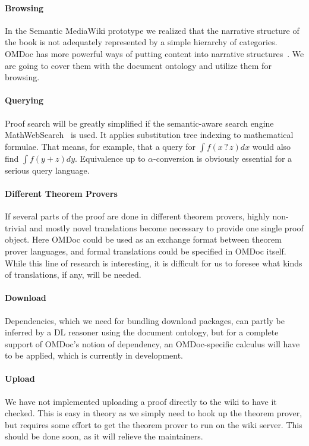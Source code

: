 \paragraph{Browsing} In the Semantic MediaWiki prototype we realized that the
narrative structure of the book is not adequately represented by a simple
hierarchy of categories.  OMDoc has more powerful ways of putting content into
narrative structures~\cite{KohMueMue:dfncimk07}.  We are going to cover them with
the document ontology and utilize them for browsing.


\paragraph{Querying} Proof search will be greatly simplified if
the semantic-aware search engine MathWebSearch~\cite{KohSuc:asemf06} is
used.  It applies substitution tree indexing to mathematical formulae.
That means, for example, that a query for $\int f(x\mathop{?}z) dx$
would also find $\int f(y+z) dy$.  Equivalence up to
$\alpha$-conversion is obviously essential for a serious query
language.

\paragraph{Different Theorem Provers} If several parts of the proof are done in different
theorem provers, highly non-trivial and mostly novel translations become
necessary to provide one single proof object. Here OMDoc could be used as an
exchange format between theorem prover languages, and formal translations could
be specified in OMDoc itself.  While this line of research is interesting, it is
difficult for us to foresee what kinds of translations, if any, will be needed.

\paragraph{Download}
Dependencies, which we need for bundling download packages, can partly be
inferred by a DL reasoner using the document ontology, but for a complete
support of OMDoc's notion of dependency, an OMDoc-specific calculus will have to
be applied, which is currently in development.

\paragraph{Upload} We have not implemented uploading a proof
directly to the wiki to have it checked.  This is easy in theory
as we simply need to hook up the theorem prover, but requires some
effort to get the theorem prover to run on the wiki server.  This
should be done soon, as it will relieve the maintainers.


